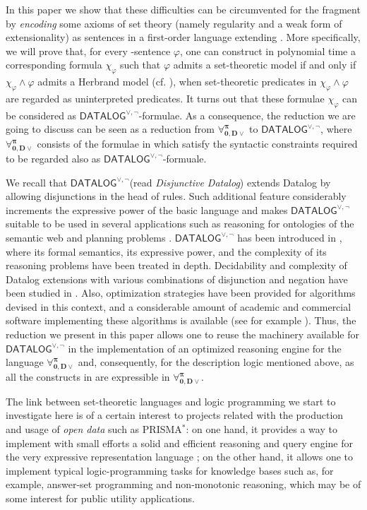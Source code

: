 \documentclass[a4paper]{llncs}
\newcommand{\DisjDatalog}{\ensuremath{\mathsf{DATALOG}^{\vee,\neg}}\xspace}
\newcommand{\ForallpizeroDisjDatalog}{\ensuremath{\mathbf{\forall_{0,D\vee}^{\pi}}}\xspace}
\begin{document}
In this paper we show that these difficulties can be circumvented for
the fragment \Forallpizero by \emph{encoding} some axioms of set
theory (namely regularity and a weak form of extensionality) as
sentences in a first-order language extending \Forallpizero.
More specifically, we will prove that, for
every \Forallpizero-sentence $\varphi$, one can construct in polynomial
time a corresponding formula $\chi_{\varphi}$ such that
$\varphi$ admits a set-theoretic model if and only if
$\chi_{\varphi} \wedge \varphi$ admits a Herbrand model (cf.
\cite{Her2002}), when set-theoretic predicates in $\chi_{\varphi}
\wedge \varphi$ are regarded as uninterpreted predicates.
%
It turns out that these formulae $\chi_{\varphi}$ can be considered
as \DisjDatalog-formulae. As a consequence, the reduction we
are going to discuss can be seen as a reduction from
\ForallpizeroDisjDatalog to \DisjDatalog, where
$\ForallpizeroDisjDatalog$
consists of the formulae in \Forallpizero which satisfy
the syntactic constraints required to be regarded also as 
\DisjDatalog-formuale.

We recall that \DisjDatalog (read \emph{Disjunctive Datalog})
extends Datalog by allowing disjunctions in the
head of rules. Such additional feature considerably increments the expressive power of the basic language and makes \DisjDatalog suitable to be used in several applications such as reasoning for ontologies of the semantic web \cite{hustadt2007reasoning} and planning problems \cite{Eiter:2004}. 
\DisjDatalog has been introduced in \cite{EitGotMan1997}, where its formal semantics, its expressive power, and the complexity of its reasoning problems have been treated in depth. Decidability and complexity of Datalog
extensions with various combinations of disjunction and negation have
been studied in \cite{AlvianoFLM12,GottlobMMP12}.
Also, optimization strategies have been provided for
algorithms devised in this context, and a considerable amount of
academic and commercial software implementing these algorithms is
available (see for example \cite{AlvFabLeoPerPfeTer2011}).  Thus, the
reduction we present in this paper allows one to reuse the machinery
available for \DisjDatalog in the implementation of an optimized
reasoning engine for the language \ForallpizeroDisjDatalog and,
consequently, for the description logic \dlForallpizero mentioned
above, as all the constructs in \dlForallpizero are expressible in
\ForallpizeroDisjDatalog.

The link between set-theoretic languages and logic programming
we start to investigate here is of a certain interest to projects related
with the production and usage of \emph{open data} such as PRISMA$^{*}$:
on one hand, it provides a way to implement with small efforts a solid
and efficient reasoning and query engine for
the very expressive representation language \dlForallpizero; on the
other hand, it allows one to implement typical logic-programming tasks
for \dlForallpizero knowledge bases such as, for example,
answer-set programming and non-monotonic reasoning,
which may be of some interest for public utility applications.
\end{document}
